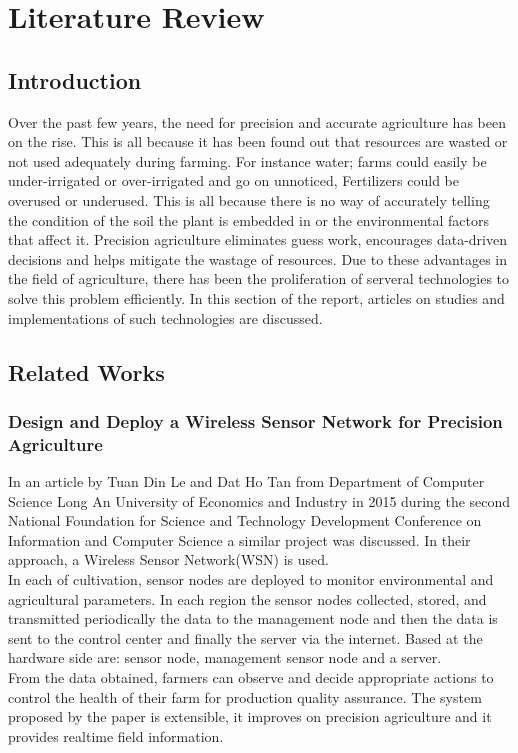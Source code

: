 \documentclass[12pt, a4paper]{article}
\begin{document}
\section{Literature Review}
\subsection{Introduction}
Over the past few years, the need for precision and accurate agriculture has been on the rise. This is all because it has been found out that resources are wasted or not used adequately during farming. For instance water; farms could easily be under-irrigated or over-irrigated and go on unnoticed, Fertilizers could be overused or underused. This is all because there is no way of accurately telling the condition of the soil the plant is embedded in or the environmental factors that affect it. Precision agriculture eliminates guess work, encourages data-driven decisions and helps mitigate the wastage of resources. Due to these advantages in the field of agriculture, there has been the proliferation of serveral technologies to solve this problem efficiently. In this section of the report, articles on studies and implementations of such technologies are discussed.

\subsection{Related Works}
\subsubsection{Design and Deploy a Wireless Sensor Network for Precision Agriculture}
In an article by Tuan Din Le and Dat Ho Tan from Department of Computer Science Long An University of Economics and Industry in 2015 during the second National Foundation for Science and Technology Development Conference on Information and Computer Science a similar project was discussed. In their approach, a Wireless Sensor Network(WSN) is used.\\ 
In each of cultivation, sensor nodes are deployed to monitor environmental and agricultural parameters. In each region the sensor nodes collected, stored, and transmitted periodically the data to the management node and then the data is sent to the control center and finally the server via the internet. Based at the hardware side are: sensor node, management sensor node and a server.\\
From the data obtained, farmers can observe and decide appropriate actions to control the health of their farm for production quality assurance. The system proposed by the paper is extensible, it improves on precision agriculture and it provides realtime field information.
\end{document}
